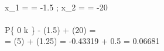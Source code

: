 \\ x_{1} =  = -1.5
\; \; ; \; \;
x_{2} =  = -20
\\
\\ P\left \{ 0 \leqslant k  \right \} \approx - \Phi (1.5) + \Phi(20) =
\\ = \Phi (5) + \Phi(1.25) = -0.43319 + 0.5 = 0.06681

